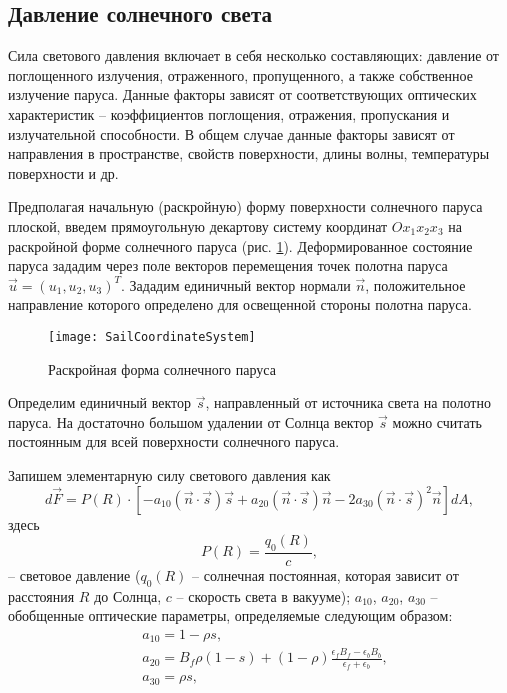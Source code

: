 \subsection{Давление солнечного света}
\noindent\indent Сила светового давления включает в себя несколько составляющих:
давление от поглощенного излучения, отраженного, пропущенного, а также собственное
излучение паруса. Данные факторы зависят от соответствующих оптических характеристик --
коэффициентов поглощения, отражения, пропускания и излучательной способности. В
общем случае данные факторы зависят от направления в пространстве, свойств поверхности,
длины волны, температуры поверхности и др.\par
  Предполагая начальную (раскройную) форму поверхности солнечного паруса плоской,
введем прямоугольную декартову систему координат $Ox_1x_2x_3$ на раскройной форме
солнечного паруса (рис. \ref{fig:SailCoordinateSystem}). Деформированное состояние
паруса зададим через поле векторов перемещения точек полотна паруса
$\vec{u} = (u_1, u_2, u_3)^T$. Зададим единичный вектор нормали $\vec{n}$,
положительное направление которого определено для освещенной стороны полотна паруса.
\begin{figure}[h]
  \centering
  \texttt{[image: SailCoordinateSystem]}
  \caption{Раскройная форма солнечного паруса}
  \label{fig:SailCoordinateSystem}
\end{figure}
Определим единичный вектор $\vec{s}$, направленный от источника света на полотно
паруса. На достаточно большом удалении от Солнца вектор $\vec{s}$ можно считать
постоянным для всей поверхности солнечного паруса.\par
  Запишем элементарную силу светового давления как
\begin{equation}
  d\vec{F} = P(R) \cdot \left[
    -a_{10}(\vec{n}\cdot\vec{s})\vec{s}
    +a_{20}(\vec{n}\cdot\vec{s})\vec{n}
    -2a_{30}(\vec{n}\cdot\vec{s})^2\vec{n}
  \right]dA,
\end{equation}
здесь
\begin{equation}
  P(R) = \frac{q_0(R)}{c},
\end{equation}
-- световое давление ($q_0(R)$ -- солнечная постоянная, которая зависит от
расстояния $R$ до Солнца, $c$ -- скорость света в вакууме); $a_{10}$, $a_{20}$,
$a_{30}$ -- обобщенные оптические параметры, определяемые следующим образом:
\begin{equation}
  \begin{aligned}
    & a_{10} = 1 - \rho s, \\
    & a_{20} = B_f\rho(1 - s) + (1 - \rho)\frac{\epsilon_f B_f - \epsilon_b B_b}{\epsilon_f + \epsilon_b}, \\
    & a_{30} = \rho s, \\
  \end{aligned}
\end{equation}
